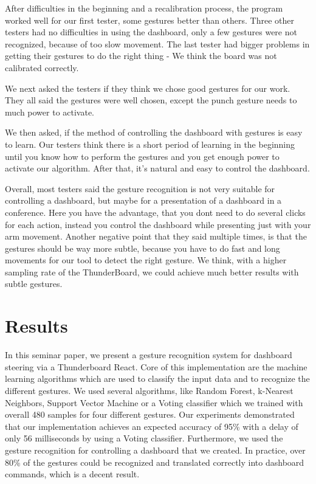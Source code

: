 After difficulties in the beginning and a recalibration process, the program worked well for our first tester, some gestures better than others.
Three other testers had no difficulties in using the dashboard, only a few gestures were not recognized, because of too slow movement.
The last tester had bigger problems in getting their gestures to do the right thing - We think the board was not calibrated correctly.

We next asked the testers if they think we chose good gestures for our work.
They all said the gestures were well chosen, except the punch gesture needs to much power to activate.

We then asked, if the method of controlling the dashboard with gestures is easy to learn.
Our testers think there is a short period of learning in the beginning until you know how to perform the gestures and you get enough power to activate our algorithm.
After that, it's natural and easy to control the dashboard.

Overall, most testers said the gesture recognition is not very suitable for controlling a dashboard, but maybe for a presentation of a dashboard in a conference.
Here you have the advantage, that you dont need to do several clicks for each action, instead you control the dashboard while presenting just with your arm movement.
Another negative point that they said multiple times, is that the gestures should be way more subtle, because you have to do fast and long movements for our tool to detect the right gesture.
We think, with a higher sampling rate of the ThunderBoard, we could achieve much better results with subtle gestures.

\chapter{Results}
\label{ch:Results}

In this seminar paper, we present a gesture recognition system for dashboard steering via a Thunderboard React. 
Core of this implementation are the machine learning algorithms which are used to classify the input data and to recognize the different gestures. 
We used several algorithms, like Random Forest, k-Nearest Neighbors, Support Vector Machine or a Voting classifier which we trained with overall 480 samples for four different gestures. 
Our experiments demonstrated that our implementation achieves an expected accuracy of 95\% with a delay of only 56 milliseconds by using a Voting classifier. 
Furthermore, we used the gesture recognition for controlling a dashboard that we created. 
In practice, over 80\% of the gestures could be recognized and translated correctly into dashboard commands, which is a decent result. 

